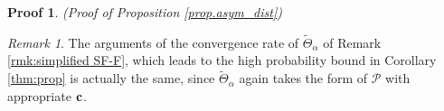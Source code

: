 \documentclass[12pt]{article}
\numberwithin{equation}{section}
\newtheorem{myPro}{Proof}
\theoremstyle{remark}
\newtheorem{myRem}{Remark}
\newcommand{\1}{{\rm 1}\kern-0.24em{\rm I}}
\begin{document}
\begin{appendices}
\begin{myPro}{(Proof of Proposition \ref{prop.asym_dist})}
 \end{myPro}
 
 \begin{myRem}
 The arguments of the  convergence rate of $\widetilde{\varTheta}_\alpha$ of  Remark  \ref{rmk:simplified SF-F}, which leads to the high probability bound in Corollary \ref{thm:prop} is actually the same, since $\widetilde{\varTheta}_\alpha$ again takes the form of $\mathcal{P}$ with appropriate $\bf c$.
 \end{myRem} 


\end{appendices}
\end{document}
